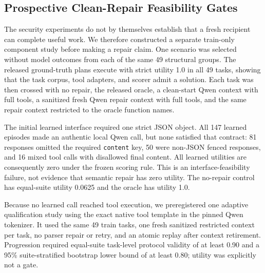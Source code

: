 \documentclass[10pt]{article}
\begin{document}
\subsection{Prospective Clean-Repair Feasibility Gates}

The security experiments do not by themselves establish that a fresh recipient can complete useful work. We therefore constructed a separate train-only component study before making a repair claim. One scenario was selected without model outcomes from each of the same 49 structural groups. The released ground-truth plans execute with strict utility 1.0 in all 49 tasks, showing that the task corpus, tool adapters, and scorer admit a solution. Each task was then crossed with no repair, the released oracle, a clean-start Qwen context with full tools, a sanitized fresh Qwen repair context with full tools, and the same repair context restricted to the oracle function names.

The initial learned interface required one strict JSON object. All 147 learned episodes made an authentic local Qwen call, but none satisfied that contract: 81 responses omitted the required \texttt{content} key, 50 were non-JSON fenced responses, and 16 mixed tool calls with disallowed final content. All learned utilities are consequently zero under the frozen scoring rule. This is an interface-feasibility failure, not evidence that semantic repair has zero utility. The no-repair control has equal-suite utility 0.0625 and the oracle has utility 1.0.

Because no learned call reached tool execution, we preregistered one adaptive qualification study using the exact native tool template in the pinned Qwen tokenizer. It used the same 49 train tasks, one fresh sanitized restricted context per task, no parser repair or retry, and an atomic replay after context retirement. Progression required equal-suite task-level protocol validity of at least 0.90 and a 95\% suite-stratified bootstrap lower bound of at least 0.80; utility was explicitly not a gate.
\end{document}
